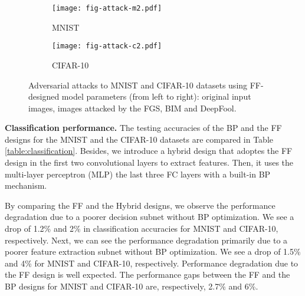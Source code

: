 \documentclass[preprint,12pt]{elsarticle}
\begin{document}
\begin{figure}[htb]
\centering
\begin{subfigure}[b]{0.4\linewidth}
\centering
\texttt{[image: fig-attack-m2.pdf]}
\caption{MNIST}
\end{subfigure}
\begin{subfigure}[b]{0.4\linewidth}
\centering
\texttt{[image: fig-attack-c2.pdf]}
\caption{CIFAR-10}
\end{subfigure}
\caption{Adversarial attacks to MNIST and CIFAR-10 datasets using
FF-designed model parameters (from left to right): original input
images, images attacked by the FGS, BIM and
DeepFool.}\label{fig:attack-2}
\end{figure}

{\bf Classification performance.} The testing accuracies of the BP and
the FF designs for the MNIST and the CIFAR-10 datasets are compared in
Table \ref{table:classification}. Besides, we introduce a hybrid design
that adoptes the FF design in the first two convolutional layers to
extract features. Then, it uses the multi-layer perceptron (MLP) the
last three FC layers with a built-in BP mechanism. 

By comparing the FF and the Hybrid designs, we observe the performance
degradation due to a poorer decision subnet without BP optimization.
We see a drop of 1.2\% and 2\% in classification accuracies for MNIST
and CIFAR-10, respectively. Next, we can see the performance degradation
primarily due to a poorer feature extraction subnet without BP
optimization. We see a drop of 1.5\% and 4\% for MNIST and CIFAR-10,
respectively.  Performance degradation due to the FF design is well
expected.  The performance gaps between the FF and the BP designs for
MNIST and CIFAR-10 are, respectively, 2.7\% and 6\%. 
\end{document}
